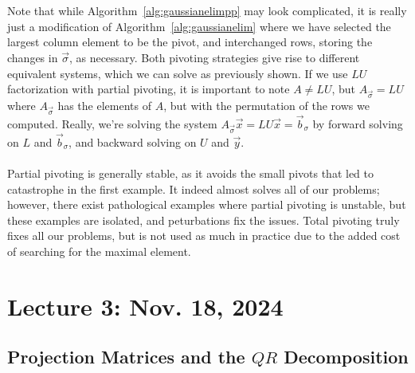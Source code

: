         \vphantom
        \\
        \\
        Note that while Algorithm~\ref{alg:gaussianelimpp} may look complicated, it is really just a modification of Algorithm~\ref{alg:gaussianelim} where we have selected the largest column element to be the pivot, and interchanged rows, storing the changes in \(\vec{\sigma}\), as necessary. Both pivoting strategies give rise to different equivalent systems, which we can solve as previously shown. If we use \(LU\) factorization with partial pivoting, it is important to note \(A\neq LU\), but \(A_{\vec{\sigma}}=LU\) where \(A_{\vec{\sigma}}\) has the elements of \(A\), but with the permutation of the rows we computed. Really, we're solving the system \(A_{\vec{\sigma}}\vec{x}=LU\vec{x}=\vec{b}_\sigma\) by forward solving on \(L\) and \(\vec{b}_\sigma\), and backward solving on \(U\) and \(\vec{y}\).
        \\
        \\
        Partial pivoting is generally stable, as it avoids the small pivots that led to catastrophe in the first example. It indeed almost solves all of our problems; however, there exist pathological examples where partial pivoting is unstable, but these examples are isolated, and peturbations fix the issues. Total pivoting truly fixes all our problems, but is not used as much in practice due to the added cost of searching for the maximal element.

\pagebreak

\section{Lecture 3: Nov. 18, 2024}

    \subsection{Projection Matrices and the \(QR\) Decomposition}

